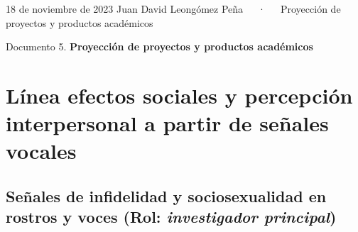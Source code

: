 \documentclass[11pt,a4paper,]{awesome-cv}
\begin{document}
\makecvheader

\makecvfooter
  {18 de noviembre de 2023}
    {Juan David Leongómez Peña~~~·~~~Proyección de proyectos y productos
académicos}
  {\thepage}





\vspace{4mm}
\begin{tcolorbox}[enhanced,
        on line, 
        boxsep=4pt, left=0pt,right=0pt,top=0pt,bottom=0pt,
        colframe=white,colback=black]
  
\color{white}
\begin{LARGE}\begin{center}
Documento 5. \textbf{Proyección de proyectos y productos académicos}
\end{center}\end{LARGE}
\end{tcolorbox}

\hypertarget{luxednea-efectos-sociales-y-percepciuxf3n-interpersonal-a-partir-de-seuxf1ales-vocales}{%
\section{Línea efectos sociales y percepción interpersonal a partir de
señales
vocales}\label{luxednea-efectos-sociales-y-percepciuxf3n-interpersonal-a-partir-de-seuxf1ales-vocales}}

\space

\hypertarget{seuxf1ales-de-infidelidad-y-sociosexualidad-en-rostros-y-voces-rol-investigador-principal}{%
\subsection{\texorpdfstring{Señales de infidelidad y sociosexualidad en
rostros y voces (Rol: \emph{investigador
principal})}{Señales de infidelidad y sociosexualidad en rostros y voces (Rol: investigador principal)}}\label{seuxf1ales-de-infidelidad-y-sociosexualidad-en-rostros-y-voces-rol-investigador-principal}}
\end{document}

